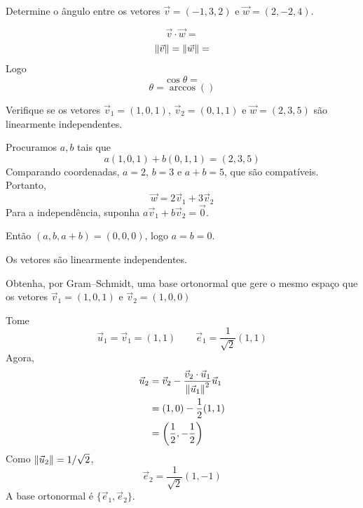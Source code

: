 \documentclass[a4paper,12pt,fleqn]{article}
\begin{document}
  Determine o ângulo entre os vetores
  $\vec{v} = (-1, 3, 2)$ e
  $\vec{w} = (2, -2, 4)$.

\begin{answer}
  \[
    \vec{v}\cdot\vec{w}
    =
  \]
  \[
    \norm{\vec{v}}
    = \norm{\vec{w}}
    =
  \]
  Logo
  \[
    \cos\theta
    =
  \]
  \[
    \theta = \arccos()
  \]
\end{answer}

Verifique se os vetores $\vec{v}_1=(1,0,1)$, $\vec{v}_2=(0,1,1)$ e $\vec{w}=(2,3,5)$
são linearmente independentes.

\begin{answer}
  Procuramos $a,b$ tais que
  \[
  a(1,0,1)+b(0,1,1)=(2,3,5)
  \]
  Comparando coordenadas, $a=2$, $b=3$ e $a+b=5$, que são compatíveis. Portanto,
  \[
  \vec{w}=2\vec{v}_1+3\vec{v}_2
  \]
  Para a independência, suponha $a\vec{v}_1+b\vec{v}_2=\vec{0}$.

  Então $(a,b,a+b)=(0,0,0)$, logo $a=b=0$.

  Os vetores são linearmente independentes.
\end{answer}

Obtenha, por Gram--Schmidt, uma base ortonormal que gere o mesmo espaço
que os vetores
$\vec{v}_1 = (1, 0, 1)$ e
$\vec{v}_2 = (1, 0, 0)$

\begin{answer}
  Tome
  \[
    \vec{u}_1=\vec{v}_1=(1,1)
    \qquad
    \vec{e}_1=\frac{1}{\sqrt{2}}(1,1)
  \]
  Agora,
  \begin{align*}
  \vec{u}_2&=\vec{v}_2-\frac{\vec{v}_2\cdot\vec{u}_1}{\norm{\vec{u}_1}^{2}}\vec{u}_1\\
  &=(1,0)-\frac{1}{2}(1,1)\\
  &=\left(\frac{1}{2},-\frac{1}{2}\right)
  \end{align*}
  Como $\norm{\vec{u}_2}=1/\sqrt{2}$,
  \[
  \vec{e}_2=\frac{1}{\sqrt{2}}(1,-1)
  \]
  A base ortonormal é $\{\vec{e}_1,\vec{e}_2\}$.

\end{answer}

\end{document}
